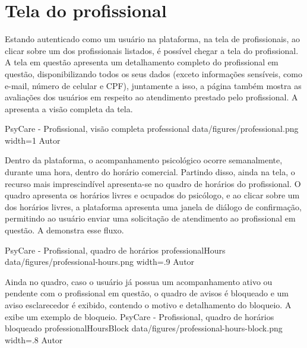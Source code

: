 \section{Tela do profissional}
\label{sec:profissional}

Estando autenticado como um usuário na plataforma, na tela de profissionais, ao clicar sobre um dos profissionais listados, é possível chegar a tela do profissional. A tela em questão apresenta um detalhamento completo do profissional em questão, disponibilizando todos os seus dados (exceto informações sensíveis, como e-mail, número de celular e CPF), juntamente a isso, a página também mostra as avaliações dos usuários em respeito ao atendimento prestado pelo profissional. A  apresenta a visão completa da tela.

\image
    {PsyCare - Profissional, visão completa}
    {professional}
    {data/figures/professional.png}
    {width=1\textwidth}
    {Autor}

Dentro da plataforma, o acompanhamento psicológico ocorre semanalmente, durante uma hora, dentro do horário comercial. Partindo disso, ainda na tela, o recurso mais imprescindível apresenta-se no quadro de horários do profissional. O quadro apresenta os horários livres e ocupados do psicólogo, e ao clicar sobre um dos horários livres, a plataforma apresenta uma janela de diálogo de confirmação, permitindo ao usuário enviar uma solicitação de atendimento ao profissional em questão. A  demonstra esse fluxo.

\image
    {PsyCare - Profissional, quadro de horários}
    {professionalHours}
    {data/figures/professional-hours.png}
    {width=.9\textwidth}
    {Autor}

Ainda no quadro, caso o usuário já possua um acompanhamento ativo ou pendente com o profissional em questão, o quadro de avisos é bloqueado e um aviso esclarecedor é exibido, contendo o motivo e detalhamento do bloqueio. A  exibe um exemplo de bloqueio.
\image
    {PsyCare - Profissional, quadro de horários bloqueado}
    {professionalHoursBlock}
    {data/figures/professional-hours-block.png}
    {width=.8\textwidth}
    {Autor}